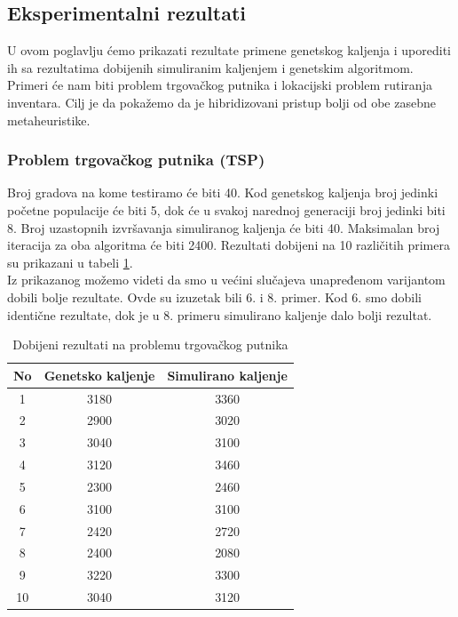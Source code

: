 \documentclass[a4paper]{article}
\begin{document}
\subsection{Eksperimentalni rezultati}

U ovom poglavlju ćemo prikazati rezultate primene genetskog kaljenja i uporediti ih sa rezultatima dobijenih simuliranim kaljenjem i genetskim algoritmom. Primeri će nam biti problem trgovačkog putnika i lokacijski problem rutiranja inventara. Cilj je da pokažemo da je hibridizovani pristup bolji od obe zasebne metaheuristike.   \\ 


\subsubsection{Problem trgovačkog putnika (TSP) \cite{gannealingthesis}}

Broj gradova na kome testiramo će biti 40. Kod genetskog kaljenja broj jedinki početne populacije će biti 5, dok će u svakoj narednoj generaciji broj jedinki biti 8. Broj uzastopnih izvršavanja simuliranog kaljenja će biti 40. Maksimalan broj iteracija za oba algoritma će biti 2400. Rezultati dobijeni na 10 različitih primera su prikazani u tabeli \ref{tab:tabela1}. \\ 

Iz prikazanog možemo videti da smo u većini slučajeva unapređenom varijantom dobili bolje rezultate. Ovde su izuzetak bili 6. i 8. primer. Kod 6. smo dobili identične rezultate, dok je u 8. primeru simulirano kaljenje dalo bolji rezultat.

\begin{table}[ht]
\begin{center}
\begin{tabular}{|c|c|c|} \hline
     No & Genetsko kaljenje & Simulirano kaljenje  \\ \hline
     1 &  3180 & 3360 \\ \hline
     2 &  2900 & 3020 \\ \hline
     3 &  3040 & 3100 \\ \hline
     4 &  3120 & 3460 \\ \hline
     5 &  2300 & 2460 \\ \hline
     6 &  3100 & 3100 \\ \hline
     7 &  2420 & 2720 \\ \hline
     8 &  2400 & 2080 \\ \hline
     9 &  3220 & 3300 \\ \hline
     10 & 3040 & 3120 \\ \hline
\end{tabular}
\end{center}
\label{tab:tabela1}
\caption{Dobijeni rezultati na problemu trgovačkog putnika}
\end{table}
\end{document}
